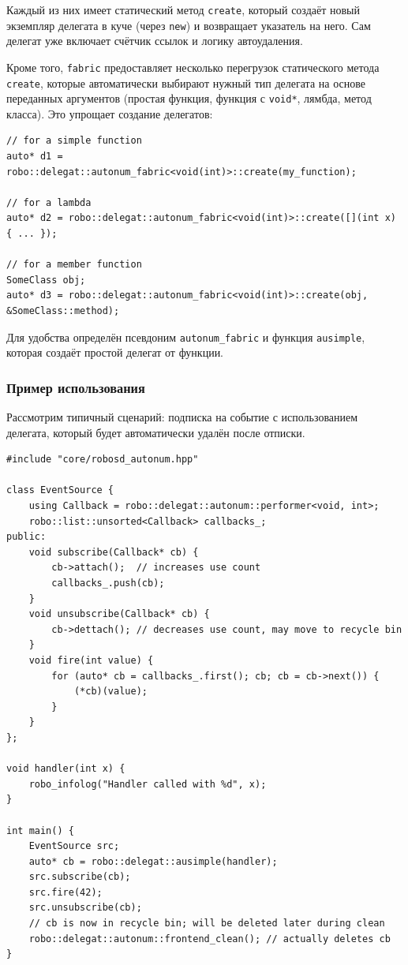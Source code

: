 \documentclass[a4paper,12pt]{article}
\begin{document}
Каждый из них имеет статический метод \texttt{create}, который создаёт новый экземпляр делегата в куче (через \texttt{new}) и возвращает указатель на него. Сам делегат уже включает счётчик ссылок и логику автоудаления.

Кроме того, \texttt{fabric} предоставляет несколько перегрузок статического метода \texttt{create}, которые автоматически выбирают нужный тип делегата на основе переданных аргументов (простая функция, функция с \texttt{void*}, лямбда, метод класса). Это упрощает создание делегатов:

\begin{lstlisting}[caption={Примеры создания делегатов через autonum::fabric}]
// for a simple function
auto* d1 = robo::delegat::autonum_fabric<void(int)>::create(my_function);

// for a lambda
auto* d2 = robo::delegat::autonum_fabric<void(int)>::create([](int x) { ... });

// for a member function
SomeClass obj;
auto* d3 = robo::delegat::autonum_fabric<void(int)>::create(obj, &SomeClass::method);
\end{lstlisting}

Для удобства определён псевдоним \texttt{autonum\_fabric} и функция \texttt{ausimple}, которая создаёт простой делегат от функции.

\subsubsection{Пример использования}

Рассмотрим типичный сценарий: подписка на событие с использованием делегата, который будет автоматически удалён после отписки.

\begin{lstlisting}[caption={Использование autonum-делегата}]
#include "core/robosd_autonum.hpp"

class EventSource {
    using Callback = robo::delegat::autonum::performer<void, int>;
    robo::list::unsorted<Callback> callbacks_;
public:
    void subscribe(Callback* cb) {
        cb->attach();  // increases use count
        callbacks_.push(cb);
    }
    void unsubscribe(Callback* cb) {
        cb->dettach(); // decreases use count, may move to recycle bin
    }
    void fire(int value) {
        for (auto* cb = callbacks_.first(); cb; cb = cb->next()) {
            (*cb)(value);
        }
    }
};

void handler(int x) {
    robo_infolog("Handler called with %d", x);
}

int main() {
    EventSource src;
    auto* cb = robo::delegat::ausimple(handler);
    src.subscribe(cb);
    src.fire(42);
    src.unsubscribe(cb);
    // cb is now in recycle bin; will be deleted later during clean
    robo::delegat::autonum::frontend_clean(); // actually deletes cb
}
\end{lstlisting}
\end{document}
